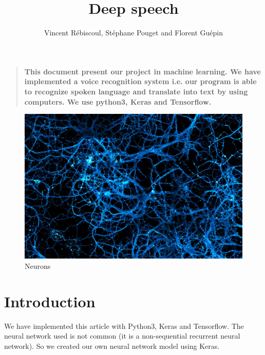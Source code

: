 \documentclass[12pt]{article}
\title{Deep speech}
\author
{Vincent R\'ebiscoul, St\'ephane Pouget and Florent Gu\'epin}
\date{}
\newenvironment{sciabstract}{%
\begin{quote} \bf}
{\end{quote}}
\begin{document}
 


\baselineskip24pt


\maketitle 




\begin{sciabstract}
  This document present our project in machine learning. We have implemented a voice recognition system i.e. our program is able to recognize spoken language and translate into text by using computers.
 We use python3, Keras and Tensorflow.
\end{sciabstract}

\begin{figure}[H]
  \begin{center}
    \includegraphics[scale=0.30]{images/neu.jpg}
    \caption{Neurons}
  \end{center}
\end{figure}

\newpage


\section*{Introduction}

We have implemented this article \cite{article} with Python3, Keras and Tensorflow. The neural network used is not common (it is a non-sequential recurrent neural network). So we created our own neural network model using Keras.
\end{document}
